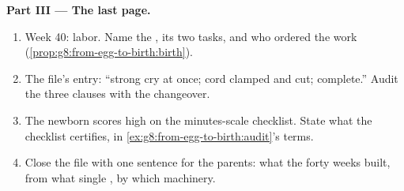 \begin{problem}
\medskip\noindent\textbf{Part III --- The last page.}
\begin{enumerate}[resume]
  \item Week 40: labor. Name the , its two tasks,
        and who ordered the work
        (\cref{prop:g8:from-egg-to-birth:birth}).
  \item The file's  entry: ``strong cry at once;
        cord clamped and cut;  complete.''
        Audit the three clauses with the changeover.
  \item The newborn scores high on the minutes-scale
        checklist. State what the checklist certifies,
        in \cref{ex:g8:from-egg-to-birth:audit}'s
        terms.
  \item Close the file with one sentence for the
        parents: what the forty weeks built, from what
        single , by which machinery.
\end{enumerate}
\end{problem}
